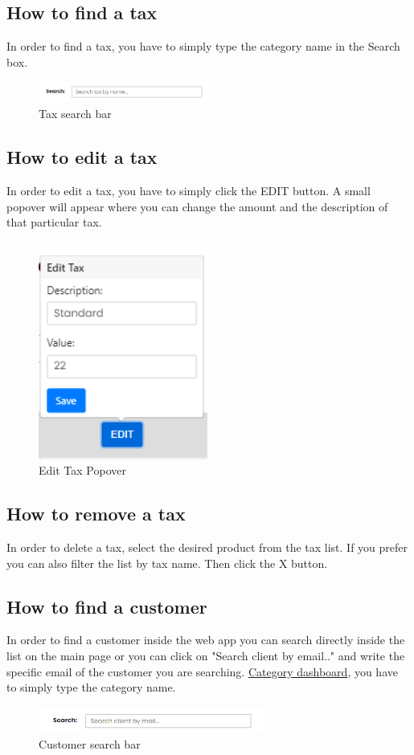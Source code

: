 \subsection{How to find a tax}\label{_findTax}
In order to find a tax, you have to simply type the category name in the Search box.
\begin{figure}[H]
    \centering
    \includegraphics[width=15em]{res/images/venditore/taxbar.png}
    \caption{Tax search bar}
\end{figure}

\subsection{How to edit a tax}\label{_editTax}
In order to edit a tax, you have to simply click the EDIT button.
A small popover will appear where you can change the amount and the description of that particular tax.
\begin{figure}[H]    
    \centering
    \includegraphics[width=15em]{res/images/venditore/edittax.png}
    \caption{Edit Tax Popover}
\end{figure}

\subsection{How to remove a tax}\label{_removeTax}
In order to delete a tax, select the desired product from the tax list. If you prefer you can also filter the list by tax name. Then click the X button.

\subsection{How to find a customer}\label{_findCustomer}
In order to find a customer inside the web app you can search directly inside the list on the main page or you can click on "Search client by email.." and write the specific email of the customer you are searching. \hyperref[_categorymanagement]{Category dashboard}, you have to simply type the category name.
\begin{figure}[H]
    \centering
    \includegraphics[width=20em]{res/images/venditore/customerbar.png}
    \caption{Customer search bar}
\end{figure}

